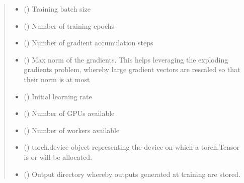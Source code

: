 \documentclass[letterpaper,10pt,english]{sphinxmanual}
\begin{document}
\begin{fulllineitems}
\begin{fulllineitems}
\begin{quote}
\begin{description}
\begin{itemize}
\item {} 
\sphinxAtStartPar
{} () \textendash{} Training batch size

\item {} 
\sphinxAtStartPar
{} () \textendash{} Number of training epochs

\item {} 
\sphinxAtStartPar
{} () \textendash{} Number of gradient accumulation steps

\item {} 
\sphinxAtStartPar
{} () \textendash{} Max norm of the gradients. This helps leveraging the exploding gradients problem, whereby
large gradient vectors are rescaled so that their norm is at most 

\item {} 
\sphinxAtStartPar
{} () \textendash{} Initial learning rate

\item {} 
\sphinxAtStartPar
{} () \textendash{} Number of GPUs available

\item {} 
\sphinxAtStartPar
{} () \textendash{} Number of workers available

\item {} 
\sphinxAtStartPar
{} () \textendash{} torch.device object representing the device on which a torch.Tensor is or
will be allocated.

\item {} 
\sphinxAtStartPar
{} (\sphinxstyleliteralemphasis{\sphinxupquote{{[}}}\sphinxstyleliteralemphasis{\sphinxupquote{, }}\sphinxstyleliteralemphasis{\sphinxupquote{{]}}}) \textendash{} Output directory whereby outputs generated at training are stored.


\end{itemize}
\end{description}
\end{quote}
\end{fulllineitems}
\end{fulllineitems}
\end{document}
